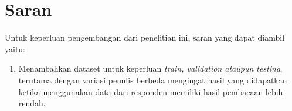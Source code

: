 \section{Saran}
\label{chap:saran}

Untuk keperluan pengembangan dari penelitian ini, saran yang dapat diambil yaitu:
\begin{enumerate}[nolistsep]
    \item Menambahkan dataset untuk keperluan \textit{train, validation \textnormal{ataupun} testing}, terutama dengan variasi penulis berbeda mengingat hasil yang didapatkan ketika menggunakan data dari responden memiliki hasil pembacaan lebih rendah.
\end{enumerate}






